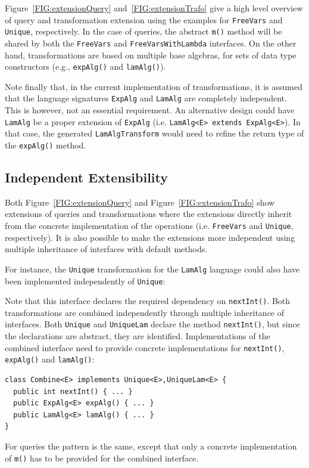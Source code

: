 Figure~\ref{FIG:extensionQuery} and~\ref{FIG:extensionTrafo} give a high level overview of query and transformation extension using the examples for {\small\texttt{FreeVars}} and \lstinline{Unique}, respectively.
In the case of queries, the abstract \lstinline{m()} method will be shared by both the \lstinline{FreeVars} and \lstinline{FreeVarsWithLambda} interfaces.
On the other hand, transformations are based on multiple base algebras, for sets of data type constructors (e.g., \lstinline{expAlg()} and \lstinline{lamAlg()}).

Note finally that, in the current implementation of \name transformations, it is assumed that the language signatures \lstinline{ExpAlg} and \lstinline{LamAlg} are completely independent.
This is however, not an essential requirement.
An alternative design could have \lstinline{LamAlg} be a proper extension of \lstinline{ExpAlg} (i.e. \lstinline{LamAlg<E> extends ExpAlg<E>}).
In that case, the generated \lstinline{LamAlgTransform} would need to refine the return type of the \lstinline{expAlg()} method.

\subsection{Independent Extensibility}

Both Figure~\ref{FIG:extensionQuery} and Figure~\ref{FIG:extensionTrafo} show extensions of queries and transformations where the extensions directly inherit from the concrete implementation of the operations (i.e. {\small\texttt{FreeVars}} and \lstinline{Unique}, respectively). It is also possible to make the extensions more independent using multiple inheritance of interfaces with default methods.

For instance, the \lstinline{Unique} transformation for the \lstinline{LamAlg} language could also have been implemented independently of \lstinline{Unique}:


Note that this interface declares the required dependency on \lstinline{nextInt()}.
Both transformations are combined independently through multiple inheritance of interfaces.
Both \lstinline{Unique} and \lstinline{UniqueLam} declare the method \lstinline{nextInt()}, but since the declarations are abstract, they are identified. Implementations of the combined interface need to provide concrete implementations for \lstinline{nextInt()}, \lstinline{expAlg()} and \lstinline{lamAlg()}:

\begin{lstlisting}
class Combine<E> implements Unique<E>,UniqueLam<E> {
  public int nextInt() { ... }
  public ExpAlg<E> expAlg() { ... }
  public LamAlg<E> lamAlg() { ... }
}
\end{lstlisting}

For queries the pattern is the same, except that only a concrete implementation of \lstinline{m()} has to be provided for the combined interface.
